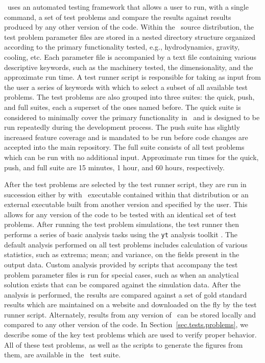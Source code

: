 \enzo\ uses an automated testing framework that allows a user to run,
with a single command, a set of test problems and compare the results
against results produced by any other version of the code.  Within the
\enzo\ source distribution, the test problem parameter files are stored
in a nested directory structure organized according to the primary
functionality tested, e.g., hydrodynamics, gravity, cooling, etc.
Each parameter file is accompanied by a text file containing various
descriptive keywords, such as the machinery tested, the
dimensionality, and the approximate run time.  A test runner script is
responsible for taking as input from the user a series of keywords
with which to select a subset of all available test problems.  The
test problems are also grouped into three suites: the quick, push, and
full suites, each a superset of the ones named before.  The quick
suite is considered to minimally cover the primary functionality in
\enzo\ and is designed to be run repeatedly during the development
process.  The push suite has slightly increased feature coverage and
is mandated to be run before code changes are accepted into the main
repository.  The full suite consists of all test problems which can be
run with no additional input.  Approximate run times for the quick,
push, and full suite are 15 minutes, 1 hour, and 60 hours,
respectively.

After the test problems are selected by the test runner script, they
are run in succession either by with \enzo\ executable contained
within that distribution or an external executable built from another
version and specified by the user.  This allows for any version of the
code to be tested with an identical set of test problems.  After
running the test problem simulations, the test runner then performs a
series of basic analysis tasks using the \texttt{yt} analysis toolkit
\citep{2011ApJS..192....9T, 2011arXiv1112.4482T}.  The default
analysis performed on all test problems includes calculation of
various statistics, such as extrema; mean; and variance, on the fields
present in the output data.  Custom analysis provided by scripts that
accompany the test problem parameter files is run for special cases,
such as when an analytical solution exists that can be compared
against the simulation data.  After the analysis is performed, the
results are compared against a set of gold standard results which are
maintained on a website and downloaded on the fly by the test runner
script.  Alternately, results from any version of \enzo\ can be stored
locally and compared to any other version of the code.  In
Section~\ref{sec.tests.problems}, we describe some of the key test
problems which are used to verify proper behavior.  All of these test
problems, as well as the scripts to generate the figures from them,
are available in the \enzo\ test suite.


